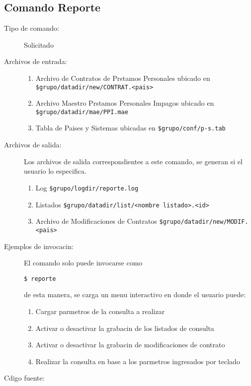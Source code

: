 \documentclass[12pt]{article}
\begin{document}
\subsection{Comando Reporte}
\begin{description}
	\item [Tipo de comando:] Solicitado
	
	\item [Archivos de entrada:]
		\begin{enumerate}
		\item Archivo de Contratos de Prstamos Personales ubicado en \verb|$grupo/datadir/new/CONTRAT.<pais>|
		\item Archivo Maestro Prstamos Personales Impagos ubicado en \verb|$grupo/datadir/mae/PPI.mae|
		\item Tabla de Paises y Sistemas ubicadas en \verb|$grupo/conf/p-s.tab|
		\end{enumerate}

	\item [Archivos de salida:] Los archivos de salida correspondientes a este comando, se generan si el usuario lo especifica. 
		\begin{enumerate}
		\item Log  \verb|$grupo/logdir/reporte.log|
		\item Listados \verb|$grupo/datadir/list/<nombre listado>.<id>|
		\item Archivo de Modificaciones de Contratos \verb|$grupo/datadir/new/MODIF.<pais>|
		\end{enumerate}

	\item [Ejemplos de invocacin:]	El comando solo puede invocarse como
	\begin{verbatim}$ reporte\end{verbatim}
	de esta manera, se carga un menu interactivo en donde el usuario puede:
		\begin{enumerate}
		\item Cargar parmetros de la consulta a realizar
		\item Activar o desactivar la grabacin de los listados de consulta
		\item Activar o desactivar la grabacin de modificaciones de contrato
		\item Realizar la consulta en base a los parmetros ingresados por teclado
		\end{enumerate}

	\item [Cdigo fuente:]
\end{description}
{\footnotesize

}
\end{document}
